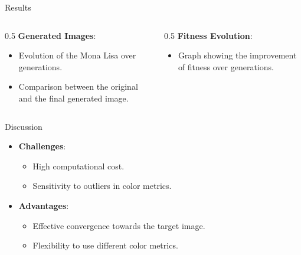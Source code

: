 
\begin{frame}{Results}
    \begin{columns}
        \begin{column}{0.5\textwidth}
            \textbf{Generated Images}:
            \begin{itemize}
                \item Evolution of the Mona Lisa over generations.
                \item Comparison between the original and the final generated image.
            \end{itemize}
        \end{column}
        \begin{column}{0.5\textwidth}
            \textbf{Fitness Evolution}:
            \begin{itemize}
                \item Graph showing the improvement of fitness over generations.
            \end{itemize}
        \end{column}
    \end{columns}
\end{frame}

\begin{frame}{Discussion}
    \begin{itemize}
        \item \textbf{Challenges}:
              \begin{itemize}
                  \item High computational cost.
                  \item Sensitivity to outliers in color metrics.
              \end{itemize}
        \item \textbf{Advantages}:
              \begin{itemize}
                  \item Effective convergence towards the target image.
                  \item Flexibility to use different color metrics.
              \end{itemize}
    \end{itemize}
\end{frame}

